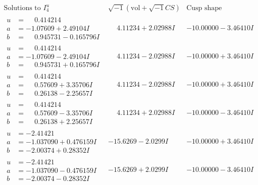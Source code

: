 \documentclass[1p]{elsarticle_modified}
\theoremstyle{definition}
\newcommand{\I}{\sqrt{-1}}
\begin{document}
$$\begin{array}{c|c|c}  
\text{Solutions to }I^u_{4}& \I (\text{vol} + \sqrt{-1}CS) & \text{Cusp shape}\\
 \hline 
\begin{aligned}
u &= \phantom{-}0.414214\phantom{ +0.000000I} \\
a &= -1.07609 + 2.49104 I \\
b &= \phantom{-}0.945731 - 0.165796 I\end{aligned}
 & \phantom{-}4.11234 + 2.02988 I & -10.00000 - 3.46410 I \\ \hline\begin{aligned}
u &= \phantom{-}0.414214\phantom{ +0.000000I} \\
a &= -1.07609 - 2.49104 I \\
b &= \phantom{-}0.945731 + 0.165796 I\end{aligned}
 & \phantom{-}4.11234 - 2.02988 I & -10.00000 + 3.46410 I \\ \hline\begin{aligned}
u &= \phantom{-}0.414214\phantom{ +0.000000I} \\
a &= \phantom{-}0.57609 + 3.35706 I \\
b &= \phantom{-}0.26138 - 2.25657 I\end{aligned}
 & \phantom{-}4.11234 - 2.02988 I & -10.00000 + 3.46410 I \\ \hline\begin{aligned}
u &= \phantom{-}0.414214\phantom{ +0.000000I} \\
a &= \phantom{-}0.57609 - 3.35706 I \\
b &= \phantom{-}0.26138 + 2.25657 I\end{aligned}
 & \phantom{-}4.11234 + 2.02988 I & -10.00000 - 3.46410 I \\ \hline\begin{aligned}
u &= -2.41421\phantom{ +0.000000I} \\
a &= -1.037090 + 0.476159 I \\
b &= -2.00374 + 0.28352 I\end{aligned}
 & -15.6269 - 2.0299 I & -10.00000 + 3.46410 I \\ \hline\begin{aligned}
u &= -2.41421\phantom{ +0.000000I} \\
a &= -1.037090 - 0.476159 I \\
b &= -2.00374 - 0.28352 I\end{aligned}
 & -15.6269 + 2.0299 I & -10.00000 - 3.46410 I \\ \hline\begin{aligned}

\end{aligned}
\end{array}$$
\end{document}
